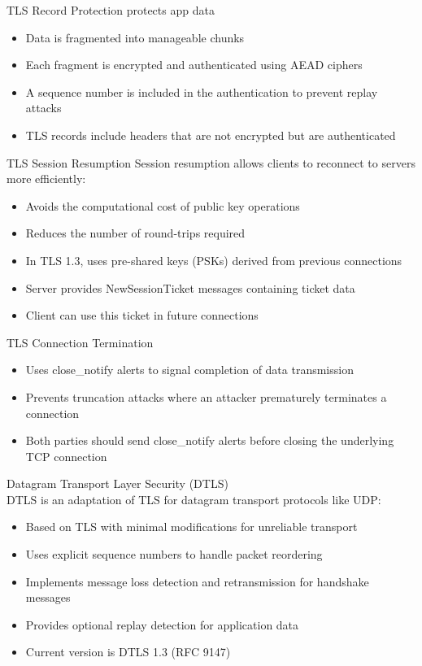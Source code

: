 \begin{concept}{TLS Record Protection} protects app data
\begin{itemize}
    \item Data is fragmented into manageable chunks
    \item Each fragment is encrypted and authenticated using AEAD ciphers
    \item A sequence number is included in the authentication to prevent replay attacks
    \item TLS records include headers that are not encrypted but are authenticated
\end{itemize}
\end{concept}


\begin{definition}{TLS Session Resumption}
Session resumption allows clients to reconnect to servers more efficiently:
\begin{itemize}
    \item Avoids the computational cost of public key operations
    \item Reduces the number of round-trips required
    \item In TLS 1.3, uses pre-shared keys (PSKs) derived from previous connections
    \item Server provides NewSessionTicket messages containing ticket data
    \item Client can use this ticket in future connections
\end{itemize}
\end{definition}

\begin{concept}{TLS Connection Termination}
\begin{itemize}
    \item Uses close\_notify alerts to signal completion of data transmission
    \item Prevents truncation attacks where an attacker prematurely terminates a connection
    \item Both parties should send close\_notify alerts before closing the underlying TCP connection
\end{itemize}
\end{concept}




\begin{definition}{Datagram Transport Layer Security (DTLS)}\\
DTLS is an adaptation of TLS for datagram transport protocols like UDP:
\begin{itemize}
    \item Based on TLS with minimal modifications for unreliable transport
    \item Uses explicit sequence numbers to handle packet reordering
    \item Implements message loss detection and retransmission for handshake messages
    \item Provides optional replay detection for application data
    \item Current version is DTLS 1.3 (RFC 9147)
\end{itemize}
\end{definition}

\multend




